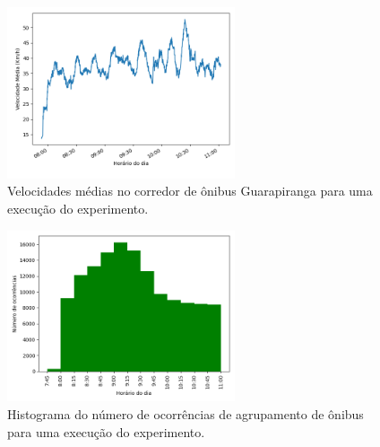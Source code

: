 

\begin{figure}[h!]
 \centering
 \includegraphics[width=0.6\textwidth]{figuras/detect_graphics/avg_speed_7-dez-su-corr_Guarapiranga.png}
 \caption{Velocidades médias no corredor de ônibus Guarapiranga para uma execução do experimento.}
 \label{fig:avg_speed_guara_1}
\end{figure}

\begin{figure}[h!]
\centering
  \includegraphics[width=0.6\textwidth]{figuras/detect_graphics/histogram_7-dez-su_BB.png}
  \caption{Histograma do número de ocorrências de agrupamento de ônibus para uma execução do experimento.}
  \label{fig:histogram_Bus_Bunching}
\end{figure}


